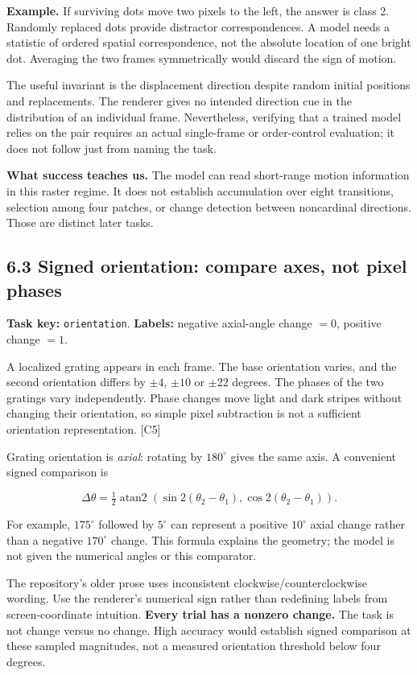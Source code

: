 \documentclass[
  11pt,
]{article}
\let\oldsubsection\subsection
\renewcommand{\subsection}{\Needspace{6\baselineskip}\oldsubsection}
\begin{document}
\textbf{Example.} If surviving dots move two pixels to the left, the
answer is class 2. Randomly replaced dots provide distractor
correspondences. A model needs a statistic of ordered spatial
correspondence, not the absolute location of one bright dot. Averaging
the two frames symmetrically would discard the sign of motion.

The useful invariant is the displacement direction despite random
initial positions and replacements. The renderer gives no intended
direction cue in the distribution of an individual frame. Nevertheless,
verifying that a trained model relies on the pair requires an actual
single-frame or order-control evaluation; it does not follow just from
naming the task.

\textbf{What success teaches us.} The model can read short-range motion
information in this raster regime. It does not establish accumulation
over eight transitions, selection among four patches, or change
detection between noncardinal directions. Those are distinct later
tasks.

\subsection{6.3 Signed orientation: compare axes, not pixel
phases}\label{signed-orientation-compare-axes-not-pixel-phases}

\textbf{Task key:} \texttt{orientation}. \textbf{Labels:} negative
axial-angle change \(=0\), positive change \(=1\).

A localized grating appears in each frame. The base orientation varies,
and the second orientation differs by \(\pm4\), \(\pm10\) or \(\pm22\)
degrees. The phases of the two gratings vary independently. Phase
changes move light and dark stripes without changing their orientation,
so simple pixel subtraction is not a sufficient orientation
representation. {[}C5{]}

Grating orientation is \emph{axial}: rotating by \(180^\circ\) gives the
same axis. A convenient signed comparison is

\[\Delta\theta=\tfrac12\operatorname{atan2}\!\left(\sin2(\theta_2-\theta_1),\cos2(\theta_2-\theta_1)\right).\]

For example, \(175^\circ\) followed by \(5^\circ\) can represent a
positive \(10^\circ\) axial change rather than a negative \(170^\circ\)
change. This formula explains the geometry; the model is not given the
numerical angles or this comparator.

The repository's older prose uses inconsistent
clockwise/counterclockwise wording. Use the renderer's numerical sign
rather than redefining labels from screen-coordinate intuition.
\textbf{Every trial has a nonzero change.} The task is not change versus
no change. High accuracy would establish signed comparison at these
sampled magnitudes, not a measured orientation threshold below four
degrees.
\end{document}
